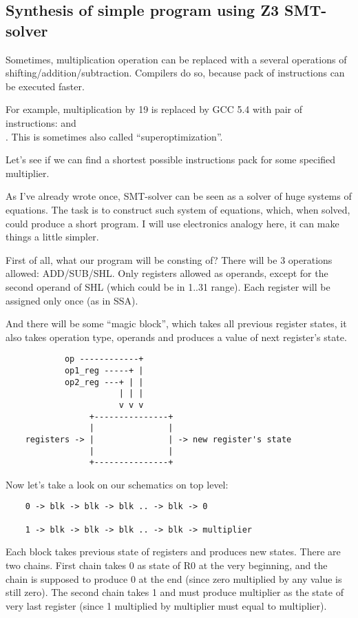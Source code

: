 \subsection{Synthesis of simple program using Z3 SMT-solver}
\label{synth_mult}

Sometimes, multiplication operation can be replaced with a several operations of shifting/addition/subtraction.
Compilers do so, because pack of instructions can be executed faster.

For example, multiplication by 19 is replaced by GCC 5.4 with pair of instructions:  and\\
.
This is sometimes also called ``superoptimization''.

Let's see if we can find a shortest possible instructions pack for some specified multiplier.

As I've already wrote once, SMT-solver can be seen as a solver of huge systems of equations.
The task is to construct such system of equations, which, when solved, could produce a short program.
I will use electronics analogy here, it can make things a little simpler.

First of all, what our program will be consting of? There will be 3 operations allowed: ADD/SUB/SHL.
Only registers allowed as operands, except for the second operand of SHL (which could be in 1..31 range).
Each register will be assigned only once (as in \ac{SSA}).

And there will be some ``magic block'', which takes all previous register states, it also takes operation type,
operands and produces a value of next register's state.

\begin{lstlisting}
	        op ------------+
	        op1_reg -----+ |
	        op2_reg ---+ | |
	                   | | |
	                   v v v
	             +---------------+
	             |               |
	registers -> |               | -> new register's state
	             |               |
	             +---------------+
\end{lstlisting}

Now let's take a look on our schematics on top level:

\begin{lstlisting}
	0 -> blk -> blk -> blk .. -> blk -> 0

	1 -> blk -> blk -> blk .. -> blk -> multiplier
\end{lstlisting}

Each block takes previous state of registers and produces new states.
There are two chains.
First chain takes 0 as state of R0 at the very beginning, and the chain is supposed to produce 0 at the end
(since zero multiplied by any value is still zero).
The second chain takes 1 and must produce multiplier as the state of very last register
(since 1 multiplied by multiplier must equal to multiplier).

